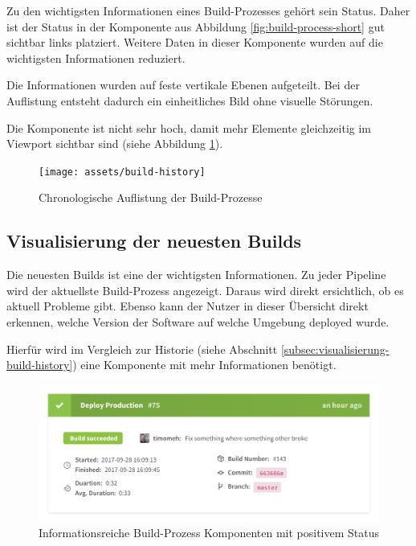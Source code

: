 Zu den wichtigsten Informationen eines Build-Prozesses gehört sein Status. Daher ist der Status in der Komponente aus Abbildung \ref{fig:build-process-short} gut sichtbar links platziert. Weitere Daten in dieser Komponente wurden auf die wichtigsten Informationen reduziert.

Die Informationen wurden auf feste vertikale Ebenen aufgeteilt. Bei der Auflistung entsteht dadurch ein einheitliches Bild ohne visuelle Störungen.

Die Komponente ist nicht sehr hoch, damit mehr Elemente gleichzeitig im Viewport sichtbar sind (siehe Abbildung \ref{fig:build-history}).

\begin{figure}[H]
  \caption{Chronologische Auflistung der Build-Prozesse}
  \label{fig:build-history}
  \centering
    \texttt{[image: assets/build-history]}
\end{figure}

\subsection{Visualisierung der neuesten Builds}

Die neuesten Builds ist eine der wichtigsten Informationen. Zu jeder Pipeline wird der aktuellste Build-Prozess angezeigt. Daraus wird direkt ersichtlich, ob es aktuell Probleme gibt. Ebenso kann der Nutzer in dieser Übersicht direkt erkennen, welche Version der Software auf welche Umgebung deployed wurde.

Hierfür wird im Vergleich zur Historie (siehe Abschnitt \ref{subsec:visualisierung-build-history}) eine Komponente mit mehr Informationen benötigt.

\begin{figure}[h]
  \caption{Informationsreiche Build-Prozess Komponenten mit positivem Status}
  \label{fig:build-process-detail}
  \centering
    \includegraphics[width=\textwidth]{assets/build-detail-finished}
\end{figure}

